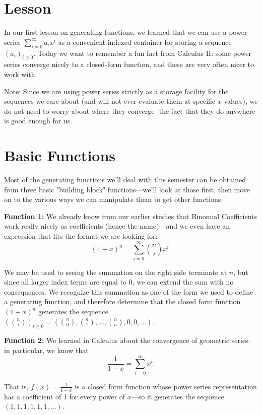 \documentclass{article}
\theoremstyle{definition}
\begin{document}




\section*{Lesson}
In our first lesson on generating functions, we learned that we can use a power series $\sum_{i=0}^{\infty} a_{i} x^{i}$ as a convenient indexed container for storing a sequence $\left(a_{i}\right)_{i \geq 0}$. Today we want to remember a fun fact from Calculus II: some power series converge nicely to a closed-form function, and these are very often nicer to work with.

Note: Since we are using power series strictly as a storage facility for the sequences we care about (and will not ever evaluate them at specific $x$ values), we do not need to worry about where they converge- the fact that they do anywhere is good enough for us.

\section*{Basic Functions}
Most of the generating functions we'll deal with this semester can be obtained from three basic "building block" functions---we'll look at those first, then move on to the various ways we can manipulate them to get other functions.

\textbf{Function 1:} We already know from our earlier studies that Binomial Coefficients work really nicely as coefficients (hence the name)---and we even have an expression that fits the format we are looking for:
\[(1+x)^{n}=\sum_{i=0}^{\infty}\binom{n}{i} x^{i}.\]

We may be used to seeing the summation on the right side terminate at $n$, but since all larger index terms are equal to 0, we can extend the sum with no consequences. We recognize this summation as one of the form we used to define a generating function, and therefore determine that the closed form function $(1+x)^{n}$ generates the sequence $\left(\binom{n}{i}\right)_{i \geq 0}=\left(\binom{n}{0},\binom{n}{1}, \ldots,\binom{n}{n}, 0,0, \ldots\right)$.

\textbf{Function 2:} We learned in Calculus about the convergence of geometric series: in particular, we know that
\[\frac{1}{1-x}=\sum_{i=0}^{\infty} x^{i}.\]

That is, $f(x)=\frac{1}{1-x}$ is a closed form function whose power series representation has a coefficient of 1 for every power of $x$---so it generates the sequence $(1,1,1,1,1,1, \ldots)$.
\end{document}
